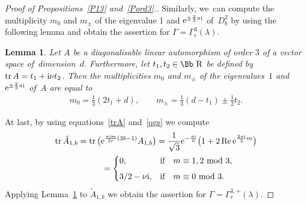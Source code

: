 \documentclass[pdftex]{sigma}
\newcommand\RR{{\mbox{\Bb R}}}
\newcommand{\tr}{\mathop{{\rm tr}}}
\renewcommand{\Re}{\mathop{{\rm Re}}}
\numberwithin{equation}{section}
\newtheorem{Lemma}[Theorem]{Lemma}
\begin{document}
\begin{proof}[Proof of Propositions~\ref{P13} and~\ref{Pord3}.]
Similarly, we~can compute the multiplicity $m_0$ and $m_\pm$ of the eigenvalue 1 and ${\rm e}^{\pm\frac{2}{3}\pi {\rm i}}$ of~$D_b^2$ by using the following lemma and obtain the assertion for $\Gamma=\Gamma^3_r(\lambda)$.
\begin{Lemma}\label{LD3}
Let $A$ be a diagonalisable linear automorphism of order $3$ of a vector space of~dimension~$d$. Furthermore, let $t_1,t_2\in \RR$ be defined by $\tr A= t_1+{\rm i}\nu t_2$.
Then the multiplicities $m_0$ and $m_\pm$ of the eigenvalues~$1$ and ${\rm e}^{\pm\frac{2}{3}\pi {\rm i}}$ of~$A$ are equal to
\begin{gather*}
m_0 = \frac{1}{3}(2t_1+d),\qquad
m_\pm = \frac{1}{3}(d-t_1)\pm\frac{1}{2}t_2.
\end{gather*}
\end{Lemma}

At last, by using equations~\eqref{trA} and~\eqref{qgs} we compute
\begin{gather*}
\tr \tilde A_{1,b}= \tr \big({\rm e}^{\frac{\pi {\rm i}m}{3r}(3b-1)} A_{1,b}\big)
= \frac1{\sqrt 3}{\rm e}^{-\frac{\pi {\rm i}}6}\big(1+2\Re {\rm e}^{\frac{2\pi {\rm i}}3 m}\big)
\\ \hphantom{\tr \tilde A_{1,b}}
{}=\begin{cases}
0, &\text{if}\quad m\equiv 1,2\ {\rm mod}\ 3,
\\[1ex]
{3}/{2}-\nu {\rm i}, &\text{if}\quad m\equiv 0\ {\rm mod}\ 3.
\end{cases}
\end{gather*}
Applying Lemma~\ref{LD3} to $\tilde A_{1,b}$ we obtain the assertion for $\Gamma=\Gamma^{3,+}_r(\lambda)$.
\end{proof}
\end{document}
